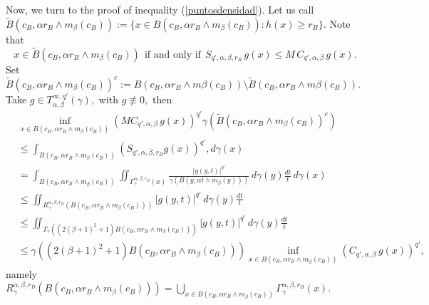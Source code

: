 \documentclass[leqno,11pt]{amsart}
\theoremstyle{plain}
\theoremstyle{remark}
\begin{document}
{{Now, we turn to the proof of inequality (\ref{puntosdensidad}).
Let us call $\widetilde{B}(c_B, \alpha r_B\wedge m_\beta(c_B)):=\{x\in B(c_B,\alpha r_B\wedge m_\beta (c_B)): h(x)\ge r_B\}.$ Note that $$x\in \widetilde{B}(c_B,\alpha r_B\wedge m_\beta(c_B)) \ \ \text{if\ and\ only\ if}\ \ S_{q', \alpha, \beta,r_B}\, g(x)\le M\, C_{q',\alpha, \beta}\, g (x).$$ Set $\widetilde{B}(c_B, \alpha r_B\wedge m_\beta(c_B))^c:=B(c_B,\alpha r_B\wedge m\beta (c_B))\setminus \widetilde{B}(c_B, \alpha r_B\wedge m\beta (c_B)).$ Take $g\in T^{\infty, q'}_{\alpha,\beta}(\gamma),$ with $g\not \equiv 0,$ then 
\begin{align*}
&\inf_{x\in B(c_B, \alpha r_B\wedge m_\beta(c_B))}  (M C_{q',\alpha,\beta}\, g (x))^{q'}  \gamma (\widetilde{B}(c_B,\alpha r_B\wedge m_\beta (c_B))^c) \\ 
& \le \int_{B(c_B, \alpha r_B\wedge m_\beta (c_B))} (S_{q',\alpha,\beta, r_B} g (x))^{q'}, d\gamma (x)\\ & =\int_{B(c_B, \alpha r_B\wedge m_\beta (c_B))} \iint_{\Gamma_\gamma^{\alpha, \beta, r_B}(x)}  \frac{|g(y,t)|^{q'}}{\gamma (B(y,\alpha t\wedge m_\beta (y)))}\, d\gamma(y)\frac{dt}{t}\, d\gamma(x)\\ & \le \iint_{R^{\alpha, \beta, r_B}_{\gamma}(B(c_B, \alpha r_B\wedge m_{\beta} (c_B)))} |g(y,t)|^{q'} \, d\gamma (y)\frac{dt}{t}\\ &\le \iint_{T_\gamma((2(\beta+1)^2+1) B(c_B, \alpha r_B\wedge m_\beta (c_B)))} |g(y,t)|^{q'}\, d\gamma(y)\frac{dt}{t}\\ & \le \gamma ((2(\beta+1)^2+1) B(c_B, \alpha r_B\wedge m_\beta(c_B)))\inf_{x\in B(c_B, \alpha r_B\wedge m_\beta (c_B))} (C_{q',\alpha, \beta}\, g(x))^{q'},
\end{align*}
namely $R_\gamma^{\alpha, \beta, r_B}(B(c_B, \alpha r_B\wedge m_{\beta} (c_B)))=\bigcup_{x\in B(c_B, \alpha r_B\wedge m_\beta (c_B))}\Gamma_\gamma^{\alpha, \beta, r_B}(x).$

}}
\end{document}

